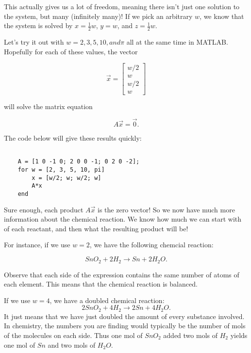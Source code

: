 \documentclass{ximera}
\begin{document}
\begin{exploration}
\begin{example}
This actually gives us a lot of freedom, meaning there isn't just one solution to the system, but many (infinitely many)! If we pick an arbitrary $w$, we know that the system is solved by $x=\frac{1}{2}w$, $y=w$, and $z=\frac{1}{2}w$.

Let's try it out with $w=2, 3, 5, 10, and \pi$ all at the same time in MATLAB. Hopefully for each of these values, the vector 

$$\vec{x}=\begin{bmatrix} w/2 \\ w \\ w/2 \\ w \end{bmatrix}$$

will solve the matrix equation

$$A\vec{x}=\vec{0}.$$

The code below will give these results quickly:

\begin{verbatim}

    A = [1 0 -1 0; 2 0 0 -1; 0 2 0 -2];
    for w = [2, 3, 5, 10, pi]
        x = [w/2; w; w/2; w]
        A*x
    end

\end{verbatim}

Sure enough, each product $A\vec{x}$ is the zero vector! So we now have much more information about the chemical reaction. We know how much we can start with of each reactant, and then what the resulting product will be!

For instance, if we use $w=2$, we have the following chemcial reaction: 

\begin{equation*}
  SnO_2+2H_2\rightarrow Sn+2H_2O.
\end{equation*}

Observe that each side of the expression contains the same number of
atoms of each element. This means that the chemical reaction is
balanced. 

If we use $w=4$, we have a doubled chemical reaction:
\begin{equation*}
  2SnO_2+4H_2\rightarrow 2Sn+4H_2O.
\end{equation*}
It just means that we have just doubled the amount of
every substance involved. In chemistry, the numbers you are finding
would typically be the number of mols of the molecules on each
side. Thus one mol of $SnO_2$ added two mols of $H_2$ yields one mol
of $Sn$ and two mols of $H_2O$.


\end{example}
\end{exploration}
\end{document}
